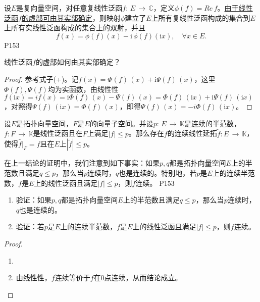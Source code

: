 \original
{
	设$E$是复向量空间，对任意复线性泛函$f:\, E\,\rightarrow\, \mathbb{C} $，定义$\phi(f)=Re\, f $。\underline{由于线性泛函$f$的虚部可由其实部确定}，则映射$\phi$建立了$E$上所有复线性泛函构成的集合到$E$上所有实线性泛函构成的集合上的双射，并且
	\begin{equation*}\tag{+}
		f(x)=\phi (f)(x)-\mathrm{i} \, \phi (f)(\mathrm{i} x),\quad \forall x\in E.
	\end{equation*}
}{P153}

\begin{proposition}
	线性泛函$f$的虚部如何由其实部确定？
\end{proposition}
\begin{proof}
	参考式子(+)。记$f(x)=\Phi(f)\,(x)+\mathrm{i}\Psi(f)\,(x) $，这里$\Phi(f),\Psi(f)$均为实函数，由线性性$f(\mathrm{i}x)=if(x)=\mathrm{i}\Phi(f)\, (x) -\Psi(f) \, (x)= \Phi(f)\, (\mathrm{i}x) +\mathrm{i}\Psi(f)\, (\mathrm{i}x) $，对照得$\Psi(f)\,(\mathrm{i}x)=\Phi(f)\,(x) $，即得$\Psi(f)\, (x)=-i\Phi(f)\, (\mathrm{i}x) $。
\end{proof}

\begin{corollary}
	设$E$是拓扑向量空间，$F$是$E$的向量子空间。并设$p:\,E \, \rightarrow \, \mathbb{K} $是连续的半范数，$f:F\, \rightarrow \, \mathbb{K} $是线性泛函且在$F$上满足$|f|\leq p $。那么存在$f$的连续线性延拓$\tilde{f}: E\, \rightarrow \, \mathbb{K} $，使得$\tilde{f\big| }_{F} =f $且在$E$上$|\tilde{f}|\leq p $。
\end{corollary}

\original
{
	在上一结论的证明中，我们注意到如下事实：如果$p,q$都是拓扑向量空间$E$上的半范数且满足$q\leq p$，那么当$p$连续时，$q$也是连续的。特别地，若$p$是$E$上的连续半范数，$f$是$E$上的线性泛函且满足$|f|\leq p$，则$f$连续。
}{P153}

\begin{proposition}
	\begin{enumerate}
		\item 验证：如果$p,q$都是拓扑向量空间$E$上的半范数且满足$q\leq p$，那么当$p$连续时，$q$也是连续的。
		\item 验证：若$p$是$E$上的连续半范数，$f$是$E$上的线性泛函且满足$|f|\leq p$，则$f$连续。
	\end{enumerate}
\end{proposition}
\begin{proof}
	\begin{enumerate}
		\item 
		\item 由线性性，$f$连续等价于$f$在$0$点连续，从而结论成立。
	\end{enumerate}
\end{proof}

